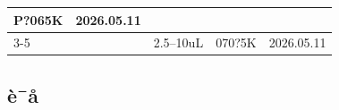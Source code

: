\documentclass[UTF8,10pt,a4paper,fontset=fandol]{ctexart}
\newcommand{\fieldvalue}[1]{#1}
\newcommand{\handwritten}[1]{#1}
\begin{document}
\begin{center}
\begin{tabularx}{\textwidth}{|p{}|p{}|p{}|X|p{}|}
\fieldvalue{\handwritten{P?065K}} &
\fieldvalue{\handwritten{2026.05.11}} \\ \cline{3-5}
& &
\fieldvalue{\handwritten{2.5--10uL}} &
\fieldvalue{\handwritten{070?5K}} &
\fieldvalue{\handwritten{2026.05.11}} \\ \hline
\end{tabularx}
\end{center}

\subsection{è¯å}
\end{document}
